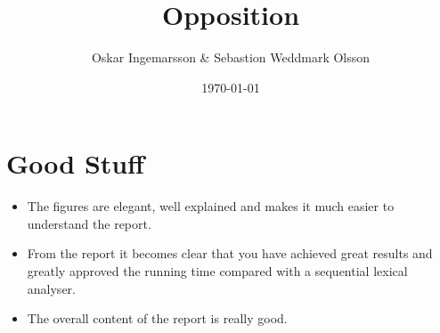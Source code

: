 \documentclass{article}
\title{Opposition}
\author{Oskar Ingemarsson \& Sebastion Weddmark Olsson}
\begin{document}
\date{\today}
\maketitle

\section*{Good Stuff}
\begin{itemize}
\item The figures are elegant, well explained and makes it much easier to
understand the report.
\item From the report it becomes clear that you have achieved great results and
greatly approved the running time compared with a sequential lexical analyser.
\item The overall content of the report is really good.
\end{itemize}
\end{document}
